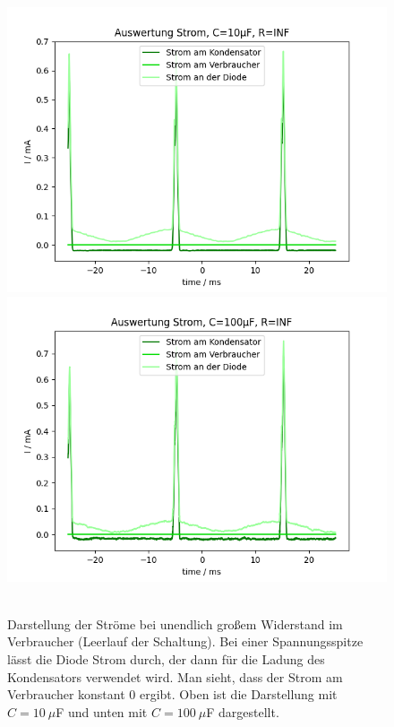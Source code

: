 \documentclass{article}
\begin{document}
\begin{figure}[H]
\caption{Darstellung der Ströme bei unendlich großem Widerstand im Verbraucher (Leerlauf der Schaltung). Bei einer Spannungsspitze lässt die Diode Strom durch, der dann für die Ladung des Kondensators verwendet wird. Man sieht, dass der Strom am Verbraucher konstant 0 ergibt. Oben ist die Darstellung mit $C=10~\mu$F und unten mit $C=100~\mu$F dargestellt.}
\label{fig:grafik_task3_auswertung2_10_und_100_inf}
{\centering
\includegraphics[scale=0.6]{bilder/task3_auswertung2_10mu_Rinf.png}
\includegraphics[scale=0.6]{bilder/task3_auswertung2_100mu_Rinf.png}
~
}
\end{figure}
\end{document}
